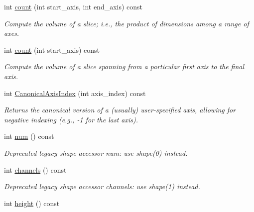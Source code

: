 \begin{DoxyCompactItemize}
\item 
int \hyperlink{classcaffe_1_1Blob_adcc7936d19ff798cfa8f24901a63d1fa}{count} (int start\+\_\+axis, int end\+\_\+axis) const 
\begin{DoxyCompactList}\small\item\em Compute the volume of a slice; i.\+e., the product of dimensions among a range of axes. \end{DoxyCompactList}\item 
int \hyperlink{classcaffe_1_1Blob_aca6ae30ecc52bd38699fd82fdbe147f7}{count} (int start\+\_\+axis) const 
\begin{DoxyCompactList}\small\item\em Compute the volume of a slice spanning from a particular first axis to the final axis. \end{DoxyCompactList}\item 
int \hyperlink{classcaffe_1_1Blob_a6ce87a58a08438c46a4858929a77ee77}{Canonical\+Axis\+Index} (int axis\+\_\+index) const 
\begin{DoxyCompactList}\small\item\em Returns the \textquotesingle{}canonical\textquotesingle{} version of a (usually) user-\/specified axis, allowing for negative indexing (e.\+g., -\/1 for the last axis). \end{DoxyCompactList}\item 
int \hyperlink{classcaffe_1_1Blob_a56c2b25db397d9e82bbd7c43597ae427}{num} () const \hypertarget{classcaffe_1_1Blob_a56c2b25db397d9e82bbd7c43597ae427}{}\label{classcaffe_1_1Blob_a56c2b25db397d9e82bbd7c43597ae427}

\begin{DoxyCompactList}\small\item\em Deprecated legacy shape accessor num\+: use shape(0) instead. \end{DoxyCompactList}\item 
int \hyperlink{classcaffe_1_1Blob_a744a987091c4496a2236898ee39558ec}{channels} () const \hypertarget{classcaffe_1_1Blob_a744a987091c4496a2236898ee39558ec}{}\label{classcaffe_1_1Blob_a744a987091c4496a2236898ee39558ec}

\begin{DoxyCompactList}\small\item\em Deprecated legacy shape accessor channels\+: use shape(1) instead. \end{DoxyCompactList}\item 
int \hyperlink{classcaffe_1_1Blob_a422a10a605c30ac02a5377e7cf4c8c6c}{height} () const \hypertarget{classcaffe_1_1Blob_a422a10a605c30ac02a5377e7cf4c8c6c}{}\label{classcaffe_1_1Blob_a422a10a605c30ac02a5377e7cf4c8c6c}


\end{DoxyCompactItemize}
